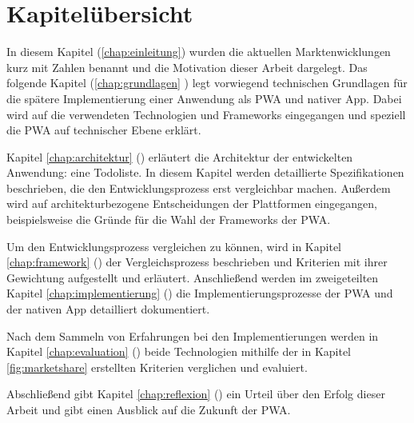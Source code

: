\section{Kapitelübersicht}
In diesem Kapitel (\ref{chap:einleitung}) wurden die aktuellen Marktenwicklungen kurz mit Zahlen benannt und die Motivation dieser Arbeit dargelegt. Das folgende Kapitel 
(\ref{chap:grundlagen} ) legt vorwiegend technischen Grundlagen für die spätere Implementierung einer Anwendung als PWA und nativer App. Dabei wird auf die verwendeten Technologien und Frameworks eingegangen und speziell die PWA auf technischer Ebene erklärt. 

Kapitel \ref{chap:architektur} () erläutert die Architektur der entwickelten Anwendung: eine Todoliste. In diesem Kapitel werden detaillierte Spezifikationen beschrieben, die den Entwicklungsprozess erst vergleichbar machen. Außerdem wird auf architekturbezogene Entscheidungen der Plattformen eingegangen, beispielsweise die Gründe für die Wahl der Frameworks der PWA.

Um den Entwicklungsprozess vergleichen zu können, wird in Kapitel \ref{chap:framework} () der Vergleichsprozess beschrieben und Kriterien mit ihrer Gewichtung aufgestellt und erläutert. Anschließend werden im zweigeteilten Kapitel \ref{chap:implementierung} () die Implementierungsprozesse der PWA und der nativen App detailliert dokumentiert.

Nach dem Sammeln von Erfahrungen bei den Implementierungen werden in Kapitel \ref{chap:evaluation} () beide Technologien mithilfe der in Kapitel \ref{fig:marketshare} erstellten Kriterien verglichen und evaluiert.

Abschließend gibt Kapitel \ref{chap:reflexion} () ein Urteil über den Erfolg dieser Arbeit und gibt einen Ausblick auf die Zukunft der PWA.
